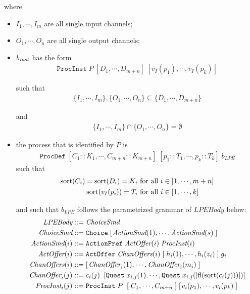 where

\begin{itemize}
\item $I_1, \cdots{}, I_m$ are all single input channels;
\item $O_1, \cdots{}, O_n$ are all single output channels;
\item $b_\text{\textit{inst}}$ has the form
\begin{align*}
\texttt{ProcInst} \; P \; [D_1, \cdots{}, D_{m+n}] \; [v_I(p_1), \cdots{}, v_I(p_k)]
\end{align*}

such that
\begin{align*}
\{ I_1, \cdots{}, I_m \}, \{ O_1, \cdots{}, O_n \} \subseteq \{ D_1, \cdots{}, D_{m+n} \}
\end{align*}

and
\begin{align*}
\{ I_1, \cdots{}, I_m \} \cap \{ O_1, \cdots{}, O_n \} = \emptyset{}
\end{align*}

\item the \txs{} process that is identified by $P$ is
\begin{align*}
\texttt{ProcDef} \; [C_1 :: K_1, \cdots{}, C_{m+n} :: K_{m+n}] \; [p_1 :: T_1, \cdots{}, p_k :: T_k] \; b_\textit{LPE}
\end{align*}
such that
\begin{align*}
\text{sort}(C_i) = \text{sort}(D_i) = K_i &\text{ for all } i \in [1, \cdots{}, m+n] \\
\text{sort}(v_I(p_i)) = T_i &\text{ for all } i \in [1, \cdots{}, k]
\end{align*}

and such that $b_\textit{LPE}$ follows the parametrized grammar of $\textit{LPEBody}$ below:
\begin{align*}
\textit{LPEBody} &::= \textit{ChoiceSmd} \\
\textit{ChoiceSmd} &::= \texttt{Choice} \; [ \;\! \textit{ActionSmd}(1), \cdots{}, \textit{ActionSmd}(s) \; ] \\
\textit{ActionSmd}(i) &::= \texttt{ActionPref} \; \textit{ActOffer}(i) \; \textit{ProcInst}(i) \\
\textit{ActOffer}(i) &::= \texttt{ActOffer} \; \textit{ChanOffers}(i) \; [ \; h_i(1), \cdots{}, h_i(z_i) \; ] \; g_i \\
\textit{ChanOffers}(i) &::= [ \;\! \textit{ChanOffer}_i(1), \cdots{}, \textit{ChanOffer}_i(m_i) \; ] \\
\textit{ChanOffer}_i(j) &::= c_i(j) \;\; [\texttt{Quest} \; x_{i,j}(1), \cdots{}, \texttt{Quest} \; x_{i,j}(|\text{fl}(\text{sort}(c_i(j)))|)] \\
\textit{ProcInst}_i(j) &::= \texttt{ProcInst} \; P \; \; [ \; C_1, \cdots{}, C_{m+n} \; ] \; [\;\!v_i(p_1), \cdots{}, v_i(p_k) \; ]
\end{align*}


\end{itemize}
